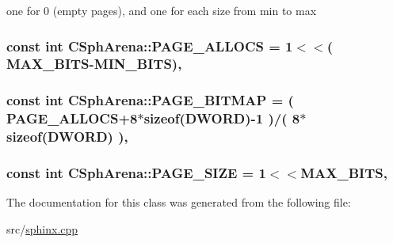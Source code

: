 one for 0 (empty pages), and one for each size from min to max 

\hypertarget{classCSphArena_ac0ce1408245d49b4ebef48f333be6304}{
\subsubsection[{P\-A\-G\-E\-\_\-\-A\-L\-L\-O\-C\-S}]{\setlength{\rightskip}{0pt plus 5cm}const {\bf int} C\-Sph\-Arena\-::\-P\-A\-G\-E\-\_\-\-A\-L\-L\-O\-C\-S = 1$<$$<$( {\bf M\-A\-X\-\_\-\-B\-I\-T\-S}-\/{\bf M\-I\-N\-\_\-\-B\-I\-T\-S})\hspace{0.3cm}{\ttfamily [static]}, {\ttfamily [protected]}}}\label{classCSphArena_ac0ce1408245d49b4ebef48f333be6304}
\hypertarget{classCSphArena_a128a5767da8610eae80c17ef00566942}{
\subsubsection[{P\-A\-G\-E\-\_\-\-B\-I\-T\-M\-A\-P}]{\setlength{\rightskip}{0pt plus 5cm}const {\bf int} C\-Sph\-Arena\-::\-P\-A\-G\-E\-\_\-\-B\-I\-T\-M\-A\-P = ( {\bf P\-A\-G\-E\-\_\-\-A\-L\-L\-O\-C\-S}+8$\ast$sizeof({\bf D\-W\-O\-R\-D})-\/1 )/( 8$\ast$sizeof({\bf D\-W\-O\-R\-D}) )\hspace{0.3cm}{\ttfamily [static]}, {\ttfamily [protected]}}}\label{classCSphArena_a128a5767da8610eae80c17ef00566942}
\hypertarget{classCSphArena_adb65db2847e9ba84de6dc19c72d568e8}{
\subsubsection[{P\-A\-G\-E\-\_\-\-S\-I\-Z\-E}]{\setlength{\rightskip}{0pt plus 5cm}const {\bf int} C\-Sph\-Arena\-::\-P\-A\-G\-E\-\_\-\-S\-I\-Z\-E = 1$<$$<${\bf M\-A\-X\-\_\-\-B\-I\-T\-S}\hspace{0.3cm}{\ttfamily [static]}, {\ttfamily [protected]}}}\label{classCSphArena_adb65db2847e9ba84de6dc19c72d568e8}


The documentation for this class was generated from the following file\-:\begin{DoxyCompactItemize}
\item 
src/\hyperlink{sphinx_8cpp}{sphinx.\-cpp}\end{DoxyCompactItemize}
